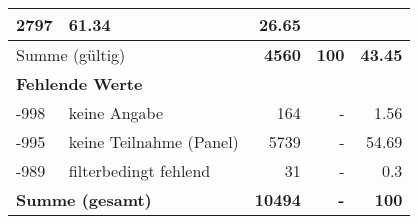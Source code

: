 \begin{longtable}{lXrrr}
       \num{2797} &
       \num[round-mode=places,round-precision=2]{61,34} &
         \num[round-mode=places,round-precision=2]{26,65} \\
     \midrule
     \multicolumn{2}{l}{Summe (gültig)} &
       \textbf{\num{4560}} &
     \textbf{100} &
       \textbf{\num[round-mode=places,round-precision=2]{43,45}} \\
     \multicolumn{5}{l}{\textbf{Fehlende Werte}}\\
       -998 &
       keine Angabe &
         \num{164} &
        - &
         \num[round-mode=places,round-precision=2]{1,56} \\
       -995 &
       keine Teilnahme (Panel) &
         \num{5739} &
        - &
         \num[round-mode=places,round-precision=2]{54,69} \\
       -989 &
       filterbedingt fehlend &
         \num{31} &
        - &
         \num[round-mode=places,round-precision=2]{0,3} \\
     \midrule
     \multicolumn{2}{l}{\textbf{Summe (gesamt)}} &
          \textbf{\num{10494}} &
        \textbf{-} &
        \textbf{100} \\
     \bottomrule
     \end{longtable}
     
